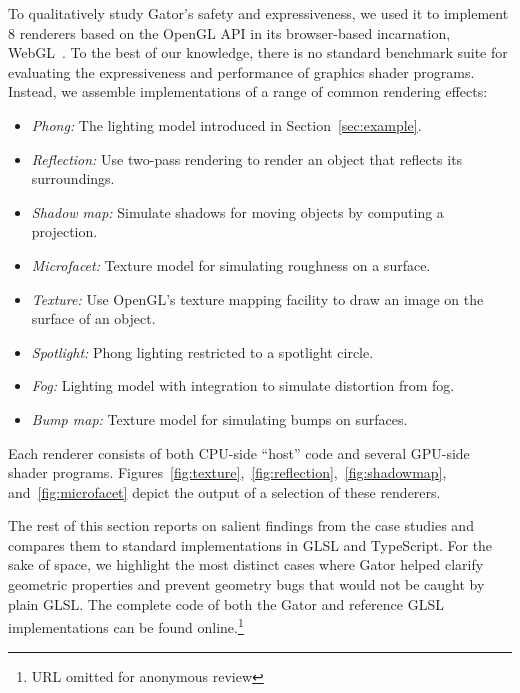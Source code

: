 {To qualitatively study Gator's safety and expressiveness, we used it to implement 8 renderers based on the OpenGL API in its browser-based incarnation, WebGL~\cite{webgl}.
To the best of our knowledge, there is no standard benchmark suite for evaluating the expressiveness and performance of graphics shader programs.
Instead, we assemble implementations of a range of common rendering effects:
%
\begin{itemize}
	\item \emph{Phong:} The lighting model introduced in Section~\ref{sec:example}.
	\item \emph{Reflection:} Use two-pass rendering to render an object that reflects its surroundings.
	\item \emph{Shadow map:} Simulate shadows for moving objects by computing a projection.
	\item \emph{Microfacet:} Texture model for simulating roughness on a surface.
	\item \emph{Texture:} Use OpenGL's texture mapping facility to draw an image on the surface of an object.
	\item \emph{Spotlight:} Phong lighting restricted to a spotlight circle.
	\item \emph{Fog:} Lighting model with integration to simulate distortion from fog.
	\item \emph{Bump map:} Texture model for simulating bumps on surfaces.
\end{itemize}
%
Each renderer consists of both CPU-side ``host'' code and several GPU-side shader programs.
Figures~\ref{fig:texture},~\ref{fig:reflection},~\ref{fig:shadowmap}, and~\ref{fig:microfacet} depict the output of a selection of these renderers.

The rest of this section reports on salient findings from the case studies and compares them to standard implementations in GLSL and TypeScript.
For the sake of space, we highlight the most distinct cases where Gator helped clarify geometric properties and prevent geometry bugs that would not be caught by plain GLSL.  The complete code of both the Gator and reference GLSL implementations can be found online.\footnote{URL omitted for anonymous review}

}
